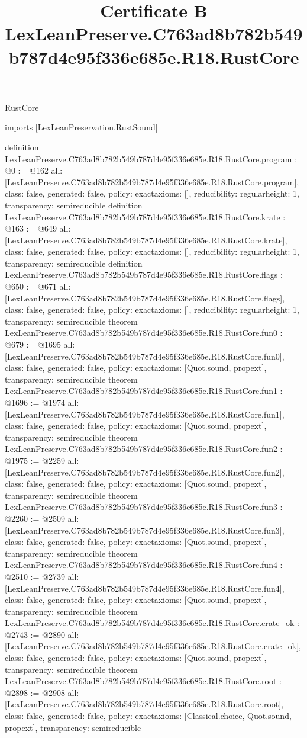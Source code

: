 \begin{lexlean}{RustCore}
\title{Certificate B LexLeanPreserve.C763ad8b782b549b787d4e95f336e685e.R18.RustCore}
\begin{coremodule}
imports [LexLeanPreservation.RustSound]

definition LexLeanPreserve.C763ad8b782b549b787d4e95f336e685e.R18.RustCore.program : @0 := @162 {
  all: [LexLeanPreserve.C763ad8b782b549b787d4e95f336e685e.R18.RustCore.program],
  class: false,
  generated: false,
  policy: exact{axioms: []},
  reducibility: regular{height: 1},
  transparency: semireducible
}
definition LexLeanPreserve.C763ad8b782b549b787d4e95f336e685e.R18.RustCore.krate : @163 := @649 {
  all: [LexLeanPreserve.C763ad8b782b549b787d4e95f336e685e.R18.RustCore.krate],
  class: false,
  generated: false,
  policy: exact{axioms: []},
  reducibility: regular{height: 1},
  transparency: semireducible
}
definition LexLeanPreserve.C763ad8b782b549b787d4e95f336e685e.R18.RustCore.flags : @650 := @671 {
  all: [LexLeanPreserve.C763ad8b782b549b787d4e95f336e685e.R18.RustCore.flags],
  class: false,
  generated: false,
  policy: exact{axioms: []},
  reducibility: regular{height: 1},
  transparency: semireducible
}
theorem LexLeanPreserve.C763ad8b782b549b787d4e95f336e685e.R18.RustCore.fun0 : @679 := @1695 {
  all: [LexLeanPreserve.C763ad8b782b549b787d4e95f336e685e.R18.RustCore.fun0],
  class: false,
  generated: false,
  policy: exact{axioms: [Quot.sound, propext]},
  transparency: semireducible
}
theorem LexLeanPreserve.C763ad8b782b549b787d4e95f336e685e.R18.RustCore.fun1 : @1696 := @1974 {
  all: [LexLeanPreserve.C763ad8b782b549b787d4e95f336e685e.R18.RustCore.fun1],
  class: false,
  generated: false,
  policy: exact{axioms: [Quot.sound, propext]},
  transparency: semireducible
}
theorem LexLeanPreserve.C763ad8b782b549b787d4e95f336e685e.R18.RustCore.fun2 : @1975 := @2259 {
  all: [LexLeanPreserve.C763ad8b782b549b787d4e95f336e685e.R18.RustCore.fun2],
  class: false,
  generated: false,
  policy: exact{axioms: [Quot.sound, propext]},
  transparency: semireducible
}
theorem LexLeanPreserve.C763ad8b782b549b787d4e95f336e685e.R18.RustCore.fun3 : @2260 := @2509 {
  all: [LexLeanPreserve.C763ad8b782b549b787d4e95f336e685e.R18.RustCore.fun3],
  class: false,
  generated: false,
  policy: exact{axioms: [Quot.sound, propext]},
  transparency: semireducible
}
theorem LexLeanPreserve.C763ad8b782b549b787d4e95f336e685e.R18.RustCore.fun4 : @2510 := @2739 {
  all: [LexLeanPreserve.C763ad8b782b549b787d4e95f336e685e.R18.RustCore.fun4],
  class: false,
  generated: false,
  policy: exact{axioms: [Quot.sound, propext]},
  transparency: semireducible
}
theorem LexLeanPreserve.C763ad8b782b549b787d4e95f336e685e.R18.RustCore.crate_ok : @2743 := @2890 {
  all: [LexLeanPreserve.C763ad8b782b549b787d4e95f336e685e.R18.RustCore.crate_ok],
  class: false,
  generated: false,
  policy: exact{axioms: [Quot.sound, propext]},
  transparency: semireducible
}
theorem LexLeanPreserve.C763ad8b782b549b787d4e95f336e685e.R18.RustCore.root : @2898 := @2908 {
  all: [LexLeanPreserve.C763ad8b782b549b787d4e95f336e685e.R18.RustCore.root],
  class: false,
  generated: false,
  policy: exact{axioms: [Classical.choice, Quot.sound, propext]},
  transparency: semireducible
}


\end{coremodule}
\end{lexlean}
